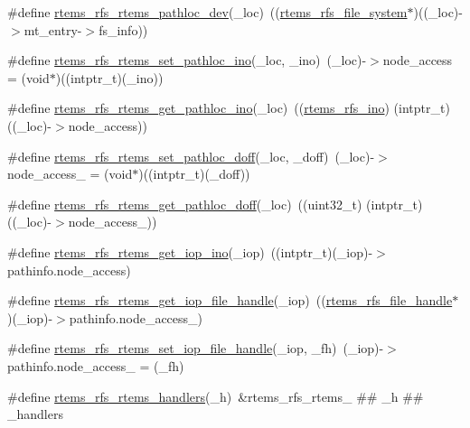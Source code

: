\begin{DoxyCompactItemize}
\item 
\#define \mbox{\hyperlink{rtems-rfs-rtems_8h_a7effab77b709f297e12efd60f43c94f1}{rtems\+\_\+rfs\+\_\+rtems\+\_\+pathloc\+\_\+dev}}(\+\_\+loc)~((\mbox{\hyperlink{struct__rtems__rfs__file__system}{rtems\+\_\+rfs\+\_\+file\+\_\+system}}$\ast$)((\+\_\+loc)-\/$>$mt\+\_\+entry-\/$>$fs\+\_\+info))
\item 
\#define \mbox{\hyperlink{rtems-rfs-rtems_8h_a435c55de00fa916c0c7229daaa410353}{rtems\+\_\+rfs\+\_\+rtems\+\_\+set\+\_\+pathloc\+\_\+ino}}(\+\_\+loc,  \+\_\+ino)~(\+\_\+loc)-\/$>$node\+\_\+access = (void$\ast$)((intptr\+\_\+t)(\+\_\+ino))
\item 
\#define \mbox{\hyperlink{rtems-rfs-rtems_8h_a1a189ed32eb8a8b93d75218f184e8815}{rtems\+\_\+rfs\+\_\+rtems\+\_\+get\+\_\+pathloc\+\_\+ino}}(\+\_\+loc)~((\mbox{\hyperlink{rtems-rfs-inode_8h_ae658325c3ff9941f2e68315d20e3c723}{rtems\+\_\+rfs\+\_\+ino}}) (intptr\+\_\+t)((\+\_\+loc)-\/$>$node\+\_\+access))
\item 
\#define \mbox{\hyperlink{rtems-rfs-rtems_8h_a060abfe719448a334892a602832f18ec}{rtems\+\_\+rfs\+\_\+rtems\+\_\+set\+\_\+pathloc\+\_\+doff}}(\+\_\+loc,  \+\_\+doff)~(\+\_\+loc)-\/$>$node\+\_\+access\+\_ = (void$\ast$)((intptr\+\_\+t)(\+\_\+doff))
\item 
\#define \mbox{\hyperlink{rtems-rfs-rtems_8h_a578137ab6e4164a0ded6d24cd6ab9646}{rtems\+\_\+rfs\+\_\+rtems\+\_\+get\+\_\+pathloc\+\_\+doff}}(\+\_\+loc)~((uint32\+\_\+t) (intptr\+\_\+t)((\+\_\+loc)-\/$>$node\+\_\+access\+\_))
\item 
\#define \mbox{\hyperlink{rtems-rfs-rtems_8h_a456d40a3292d116678781f8efa96e632}{rtems\+\_\+rfs\+\_\+rtems\+\_\+get\+\_\+iop\+\_\+ino}}(\+\_\+iop)~((intptr\+\_\+t)(\+\_\+iop)-\/$>$pathinfo.\+node\+\_\+access)
\item 
\#define \mbox{\hyperlink{rtems-rfs-rtems_8h_a5b1625eff387c2e67b182f3ec3c1e757}{rtems\+\_\+rfs\+\_\+rtems\+\_\+get\+\_\+iop\+\_\+file\+\_\+handle}}(\+\_\+iop)~((\mbox{\hyperlink{rtems-rfs-file_8h_a35a0f4ad45bd35ea0af7df0aa0ad893b}{rtems\+\_\+rfs\+\_\+file\+\_\+handle}}$\ast$)(\+\_\+iop)-\/$>$pathinfo.\+node\+\_\+access\+\_)
\item 
\#define \mbox{\hyperlink{rtems-rfs-rtems_8h_ae25991a18d906d3ba04fe91336c93070}{rtems\+\_\+rfs\+\_\+rtems\+\_\+set\+\_\+iop\+\_\+file\+\_\+handle}}(\+\_\+iop,  \+\_\+fh)~(\+\_\+iop)-\/$>$pathinfo.\+node\+\_\+access\+\_ = (\+\_\+fh)
\item 
\#define \mbox{\hyperlink{rtems-rfs-rtems_8h_af2fd1c5f777c0554c38daa3dfce108a6}{rtems\+\_\+rfs\+\_\+rtems\+\_\+handlers}}(\+\_\+h)~\&rtems\+\_\+rfs\+\_\+rtems\+\_\+ \#\# \+\_\+h \#\# \+\_\+handlers
\end{DoxyCompactItemize}
